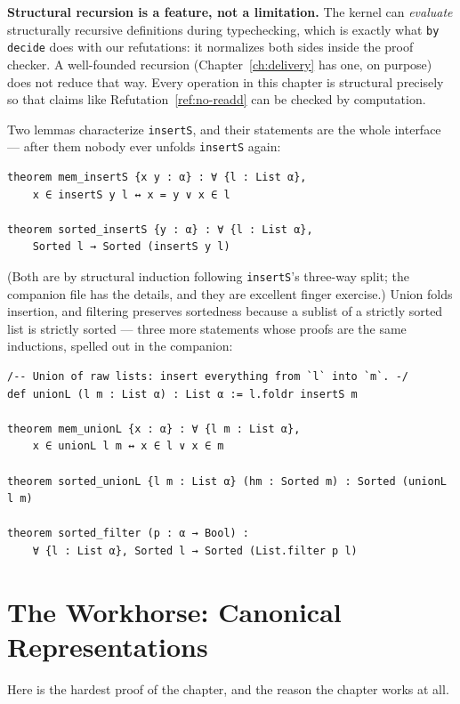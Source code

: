 \documentclass[12pt, a4paper, openright]{book}
\theoremstyle{thmstyle}
\theoremstyle{defstyle}
\newcommand{\lc}[1]{\texttt{#1}}
\newenvironment{notebox}{%
  \begin{tcolorbox}[notebox]%
}{\end{tcolorbox}}
\newcounter{exercise}[chapter]
\newcounter{refutation}[chapter]
\begin{document}
\begin{notebox}
  \textbf{Structural recursion is a feature, not a limitation.} The
  kernel can \emph{evaluate} structurally recursive definitions during
  typechecking, which is exactly what \lc{by decide} does with our
  refutations: it normalizes both sides inside the proof checker. A
  well-founded recursion (Chapter~\ref{ch:delivery} has one, on
  purpose) does not reduce that way. Every operation in this chapter is
  structural precisely so that claims like Refutation~\ref{ref:no-readd}
  can be checked by computation.
\end{notebox}

Two lemmas characterize \lc{insertS}, and their statements are the whole
interface --- after them nobody ever unfolds \lc{insertS} again:

\begin{verbatim}
theorem mem_insertS {x y : α} : ∀ {l : List α},
    x ∈ insertS y l ↔ x = y ∨ x ∈ l

theorem sorted_insertS {y : α} : ∀ {l : List α},
    Sorted l → Sorted (insertS y l)
\end{verbatim}

(Both are by structural induction following \lc{insertS}'s three-way
split; the companion file has the details, and they are excellent
finger exercise.) Union folds insertion, and filtering preserves
sortedness because a sublist of a strictly sorted list is strictly
sorted --- three more statements whose proofs are the same inductions,
spelled out in the companion:

\begin{verbatim}
/-- Union of raw lists: insert everything from `l` into `m`. -/
def unionL (l m : List α) : List α := l.foldr insertS m

theorem mem_unionL {x : α} : ∀ {l m : List α},
    x ∈ unionL l m ↔ x ∈ l ∨ x ∈ m

theorem sorted_unionL {l m : List α} (hm : Sorted m) : Sorted (unionL l m)

theorem sorted_filter (p : α → Bool) :
    ∀ {l : List α}, Sorted l → Sorted (List.filter p l)
\end{verbatim}

\section{The Workhorse: Canonical Representations}
\label{sec:sorted-ext}

Here is the hardest proof of the chapter, and the reason the chapter
works at all.
\end{document}
